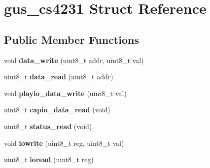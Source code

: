 \hypertarget{structgus__cs4231}{\section{gus\-\_\-cs4231 Struct Reference}
\label{structgus__cs4231}
}
\subsection*{Public Member Functions}
\begin{DoxyCompactItemize}
\item 
\hypertarget{structgus__cs4231_a76c0ed23623c342d2c185e5932736525}{void {\bfseries data\-\_\-write} (uint8\-\_\-t addr, uint8\-\_\-t val)}\label{structgus__cs4231_a76c0ed23623c342d2c185e5932736525}

\item 
\hypertarget{structgus__cs4231_aa1c18342e68fa66968c186cf5ad77153}{uint8\-\_\-t {\bfseries data\-\_\-read} (uint8\-\_\-t addr)}\label{structgus__cs4231_aa1c18342e68fa66968c186cf5ad77153}

\item 
\hypertarget{structgus__cs4231_a7d08e5066fcfc3d8f465364ee18691e6}{void {\bfseries playio\-\_\-data\-\_\-write} (uint8\-\_\-t val)}\label{structgus__cs4231_a7d08e5066fcfc3d8f465364ee18691e6}

\item 
\hypertarget{structgus__cs4231_af1904b9ecd718ce83f081d9da0a49fc1}{uint8\-\_\-t {\bfseries capio\-\_\-data\-\_\-read} (void)}\label{structgus__cs4231_af1904b9ecd718ce83f081d9da0a49fc1}

\item 
\hypertarget{structgus__cs4231_ab513494ae30be83bd6e077c45162cadf}{uint8\-\_\-t {\bfseries status\-\_\-read} (void)}\label{structgus__cs4231_ab513494ae30be83bd6e077c45162cadf}

\item 
\hypertarget{structgus__cs4231_aa700efbf697dde5b22cb2b1b6bc1e7f9}{void {\bfseries iowrite} (uint8\-\_\-t reg, uint8\-\_\-t val)}\label{structgus__cs4231_aa700efbf697dde5b22cb2b1b6bc1e7f9}

\item 
\hypertarget{structgus__cs4231_a73eea7bc05e804f29870bf21528ee3ec}{uint8\-\_\-t {\bfseries ioread} (uint8\-\_\-t reg)}\label{structgus__cs4231_a73eea7bc05e804f29870bf21528ee3ec}

\end{DoxyCompactItemize}
